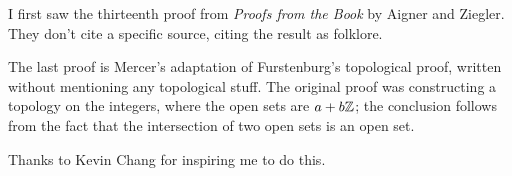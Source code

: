 \documentclass[11pt,paper=letter]{scrartcl}
\begin{document}
I first saw the thirteenth proof from \emph{Proofs from the Book} by Aigner and Ziegler. They don't cite a specific source, citing the result as folklore.

The last proof is Mercer's adaptation of Furstenburg's topological proof, written without mentioning any topological stuff. The original proof was constructing a topology on the integers, where the open sets are $a + b \mathbb Z$; the conclusion follows from the fact that the intersection of two open sets is an open set.

Thanks to Kevin Chang for inspiring me to do this.
\end{document}
